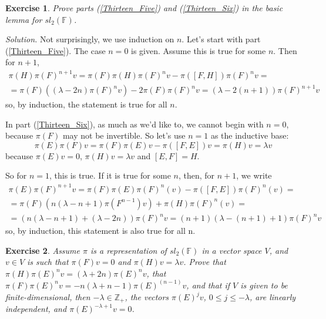 \documentclass{article}
\newtheorem{exercise}{Exercise}[section]
\begin{document}
\begin{exercise} Prove parts (\ref{Thirteen_Five}) and (\ref{Thirteen_Six}) in the basic lemma for $sl_2(\mathbb{F})$.
\end{exercise}

\emph{Solution.} Not surprisingly, we use induction on $n$. Let's start with part (\ref{Thirteen_Five}). The case $n=0$ is given. Assume this is true for some $n$. Then for $n+1$,
\begin{eqnarray}
\pi (H) \pi (F)^{n+1}v=\pi (F)\pi (H) \pi (F)^n v - \pi ([F, H]) \pi (F)^n v = \nonumber\\
= \pi (F) ((\lambda - 2n)\pi (F)^n v) -2 \pi (F) \pi(F)^n v = (\lambda - 2(n+1)) \pi(F)^{n+1}v \nonumber
\end{eqnarray}
so, by induction, the statement is true for all $n$.

In part (\ref{Thirteen_Six}), as much as we'd like to, we cannot begin with $n=0$, because $\pi (F)$ may not be invertible. So let's use $n=1$ as the inductive base:
$$
\pi(E) \pi (F)v = \pi (F)\pi (E)v - \pi([F, E])v = \pi(H)v = \lambda v
$$
because $\pi (E) v =0$, $\pi (H)v = \lambda v$ and $[E, F] = H$.

So for $n=1$, this is true. If it is true for some $n$, then, for $n+1$, we write
\begin{eqnarray}
\pi(E) \pi (F)^{n+1}v=\pi (F) \pi (E) \pi(F)^n (v) - \pi ([F, E]) \pi (F)^n (v) = \nonumber\\
=\pi(F) (n(\lambda - n + 1)\pi(F^{n-1})v) + \pi (H) \pi(F)^n (v)= \nonumber\\
= (n(\lambda -n +1) + (\lambda - 2n))\pi (F)^n v = (n+1)(\lambda - (n+1) +1)\pi (F)^n v \nonumber
\end{eqnarray}
so, by induction, this statement is also true for all n.

\begin{exercise} \label{Thirteen_SecondBasic} Assume $\pi$ is a representation of $sl_2(\mathbb{F})$ in a vector space $V$, and $v \in V$ is such that $\pi(F)v = 0$ and $\pi(H)v = \lambda v$. Prove that $\pi(H)\pi(E)^n v = (\lambda + 2n)\pi(E)^n v$, that $\pi(F) \pi(E)^n v = -n (\lambda+n-1)\pi(E)^{(n-1)}v$, and that if $V$ is given to be finite-dimensional, then $-\lambda \in \mathbb{Z}_+$, the vectors $\pi(E)^j v$, $0 \leq j \leq -\lambda$, are linearly independent, and $\pi (E)^{-\lambda + 1}v = 0$.
\end{exercise}
\end{document}
